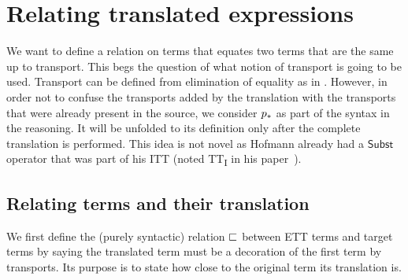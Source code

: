 \chapter{Relating translated expressions}

We want to define a relation on terms that equates two terms that are
the same up to transport.
%
This begs the question of what notion of transport is going to be
used.
%
Transport can be defined from elimination of equality as in .
However, in order not to confuse the transports added by the
translation with the transports that were already present in the
source, we consider $p_*$ as part of the syntax in the
reasoning. It will be unfolded to its definition only after the
complete translation is performed.
%
This idea is not novel as Hofmann already had a $\mathsf{Subst}$ operator that
was part of his \acrshort{ITT} (noted TT\textsubscript{I} in his
paper~).

\section{Relating terms and their translation}

We first define the (purely syntactic) relation $\sqsubset$ between \acrshort{ETT}
terms and target terms by saying the translated term must be a decoration of the
first term by transports.
Its purpose is to state how close to the original term its translation is.

